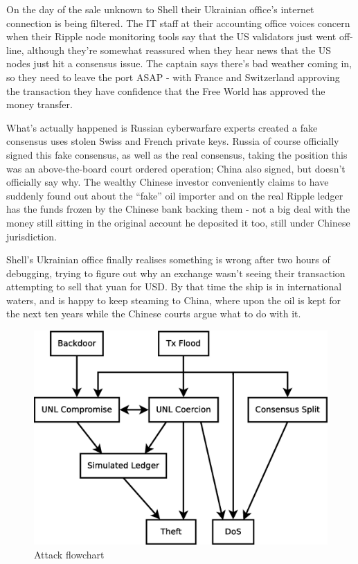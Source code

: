 \documentclass{article}
\begin{document}
On the day of the sale unknown to Shell their Ukrainian office's internet
connection is being filtered. The IT staff at their accounting office voices
concern when their Ripple node monitoring tools say that the US validators just
went off-line, although they're somewhat reassured when they hear news that the
US nodes just hit a consensus issue. The captain says there's bad weather
coming in, so they need to leave the port ASAP - with France and Switzerland
approving the transaction they have confidence that the Free World has approved
the money transfer.

What's actually happened is Russian cyberwarfare experts created a fake
consensus uses stolen Swiss and French private keys. Russia of course
officially signed this fake consensus, as well as the real consensus, taking
the position this was an above-the-board court ordered operation; China also
signed, but doesn't officially say why. The wealthy Chinese investor
conveniently claims to have suddenly found out about the ``fake'' oil importer
and on the real Ripple ledger has the funds frozen by the Chinese bank backing
them - not a big deal with the money still sitting in the original account he
deposited it too, still under Chinese jurisdiction.

Shell's Ukrainian office finally realises something is wrong after two hours of
debugging, trying to figure out why an exchange wasn't seeing their transaction
attempting to sell that yuan for USD. By that time the ship is in international
waters, and is happy to keep steaming to China, where upon the oil is kept for
the next ten years while the Chinese courts argue what to do with it.

\begin{figure}
    \centering
    \includegraphics[scale=0.5]{figures/attack-flowchart.eps}
    \caption{Attack flowchart}
    \label{fig:attack-flowchart}
\end{figure}




\end{document}
